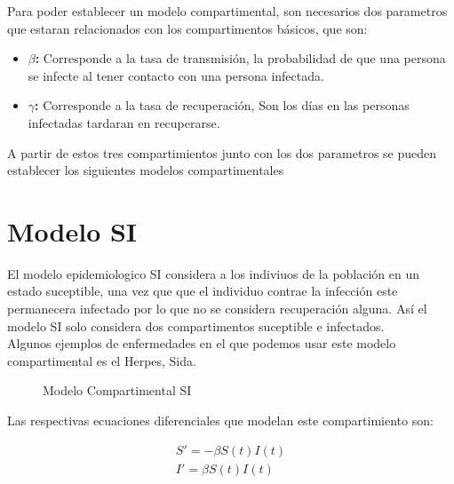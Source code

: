 Para poder establecer un modelo compartimental, son necesarios dos parametros que estaran relacionados con los compartimentos básicos, que son: 

\begin{itemize}
\item \textbf{$\beta$:} Corresponde a la tasa de transmisión, la probabilidad de que una persona se infecte al tener contacto con una persona infectada.

\item \textbf{$\gamma$:} Corresponde a la tasa de recuperación, Son los días en las personas infectadas tardaran en recuperarse.

\end{itemize}

A partir de estos tres compartimientos junto con los dos parametros se pueden establecer los siguientes modelos compartimentales \cite{Brauer}

\section{Modelo SI}

El modelo epidemiologico SI considera a los indiviuos de la población en un estado suceptible, una vez que que el individuo contrae la infección este permanecera infectado por lo que no se considera recuperación alguna. Así el modelo SI solo considera dos compartimentos suceptible e infectados.\\ 

Algunos ejemplos de enfermedades en el que podemos usar este modelo compartimental es el Herpes, Sida.\\

\begin{figure}[h]
\centering
{}
\caption{Modelo Compartimental SI} \label{fig:Compartimento SI}
\end{figure}	

Las respectivas ecuaciones diferenciales que modelan este compartimiento son: 

\begin{align}
S' =  -\beta S\left(t\right)I\left(t\right) \\
I' = \beta S\left(t\right)I\left(t\right)
\end{align}

